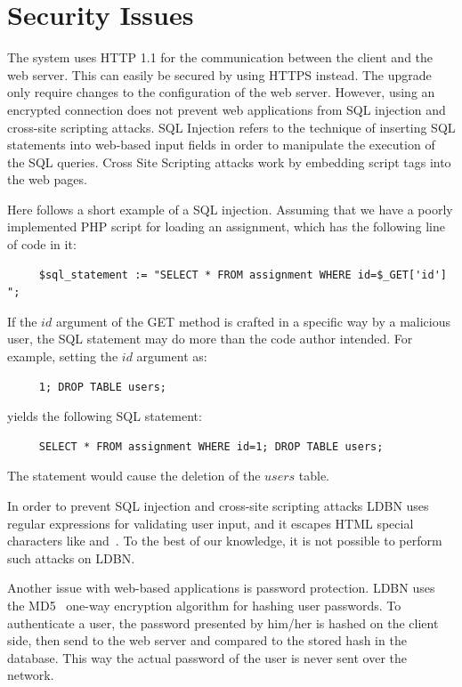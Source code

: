 \section{Security Issues}
The system uses HTTP 1.1 for the communication between the client and the web
server. This can easily be secured by using HTTPS instead. The upgrade only
require changes to the configuration of the web server. However, using an encrypted
connection does not prevent web applications from SQL injection and cross-site 
scripting attacks. SQL Injection refers to the technique of 
inserting SQL statements into web-based input fields in 
order to manipulate the execution of the SQL queries. Cross Site Scripting 
attacks work by embedding script tags into the web pages. 

Here follows a short example of a SQL injection.
Assuming that we have a poorly implemented PHP script for loading an assignment,
which has the following line of code in it:

\begin{verbatim}
     $sql_statement := "SELECT * FROM assignment WHERE id=$_GET['id'] ";
\end{verbatim}

\noindent If the $id$ argument of the GET method is crafted in a specific way by a 
malicious user, the SQL statement may do more than the code author intended. 
For example, setting the $id$ argument as:

\begin{verbatim}
     1; DROP TABLE users;
\end{verbatim}

\noindent yields the following SQL statement:

\begin{verbatim}
     SELECT * FROM assignment WHERE id=1; DROP TABLE users;
\end{verbatim}

\noindent The statement would cause the deletion of the $users$ table. 

In order to prevent SQL injection and cross-site 
scripting attacks LDBN uses regular expressions for validating
user input, and it escapes HTML special characters like \lt and~\gt.
To the best of our knowledge, it is not possible to perform such attacks on LDBN.

Another issue with web-based applications is password protection. LDBN uses the 
MD5~\cite{w7} one-way encryption algorithm for hashing user passwords. 
To authenticate a user, the password presented by him/her is hashed on the client side, 
then send to the web server and compared to the stored hash in the database. 
This way the actual password of the user is never sent over the network.
